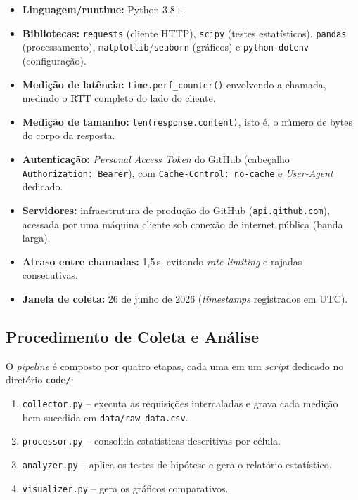 \documentclass[10pt,a4paper,twocolumn]{article}
\begin{document}
\begin{itemize}
  \item \textbf{Linguagem/runtime:} Python 3.8+.
  \item \textbf{Bibliotecas:} \texttt{requests} (cliente HTTP),
    \texttt{scipy} (testes estatísticos), \texttt{pandas} (processamento),
    \texttt{matplotlib}/\texttt{seaborn} (gráficos) e
    \texttt{python-dotenv} (configuração).
  \item \textbf{Medição de latência:} \texttt{time.perf\_counter()}
    envolvendo a chamada, medindo o RTT completo do lado do cliente.
  \item \textbf{Medição de tamanho:} \texttt{len(response.content)}, isto é,
    o número de bytes do corpo da resposta.
  \item \textbf{Autenticação:} \textit{Personal Access Token} do GitHub
    (cabeçalho \texttt{Authorization: Bearer}), com
    \texttt{Cache-Control: no-cache} e \textit{User-Agent} dedicado.
  \item \textbf{Servidores:} infraestrutura de produção do GitHub
    (\texttt{api.github.com}), acessada por uma máquina cliente sob conexão de
    internet pública (banda larga).
  \item \textbf{Atraso entre chamadas:} 1{,}5\,s, evitando \textit{rate
    limiting} e rajadas consecutivas.
  \item \textbf{Janela de coleta:} 26 de junho de 2026
    (\textit{timestamps} registrados em UTC).
\end{itemize}

\subsection{Procedimento de Coleta e Análise}

O \textit{pipeline} é composto por quatro etapas, cada uma em um \textit{script}
dedicado no diretório \texttt{code/}:

\begin{enumerate}
  \item \texttt{collector.py} -- executa as requisições intercaladas e grava
    cada medição bem-sucedida em \texttt{data/raw\_data.csv}.
  \item \texttt{processor.py} -- consolida estatísticas descritivas por célula.
  \item \texttt{analyzer.py} -- aplica os testes de hipótese e gera o
    relatório estatístico.
  \item \texttt{visualizer.py} -- gera os gráficos comparativos.
\end{enumerate}
\end{document}
